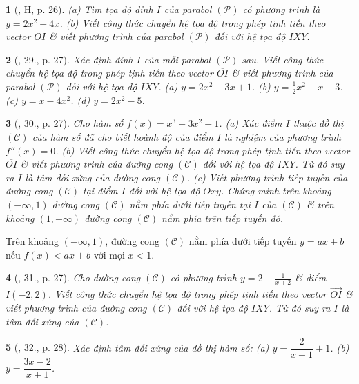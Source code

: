 \documentclass{article}
\newtheorem{baitoan}{}
\begin{document}
\begin{baitoan}[\cite{SGK_Toan_12_giai_tich_nang_cao}, H, p. 26]
	(a) Tìm tọa độ đỉnh $I$ của parabol $(\mathcal{P})$ có phương trình là $y = 2x^2 - 4x$. (b) Viết công thức chuyển hệ tọa độ trong phép tịnh tiến theo vector $\overline{OI}$ \& viết phương trình của parabol $(\mathcal{P})$ đối với hệ tọa độ $IXY$.
\end{baitoan}

\begin{baitoan}[\cite{SGK_Toan_12_giai_tich_nang_cao}, 29., p. 27]
	Xác định đỉnh $I$ của mỗi parabol $(\mathcal{P})$ sau. Viết công thức chuyển hệ tọa độ trong phép tịnh tiến theo vector $\overline{OI}$ \& viết phương trình của parabol $(\mathcal{P})$ đối với hệ tọa độ $IXY$. (a) $y = 2x^2 - 3x + 1$. (b) $y = \frac{1}{2}x^2 - x - 3$. (c) $y = x - 4x^2$. (d) $y = 2x^2 - 5$.
\end{baitoan}

\begin{baitoan}[\cite{SGK_Toan_12_giai_tich_nang_cao}, 30., p. 27]
	Cho hàm số $f(x) = x^3 - 3x^2 + 1$. (a) Xác điểm $I$ thuộc đồ thị $(\mathcal{C})$ của hàm số đã cho biết hoành độ của điểm $I$ là nghiệm của phương trình $f''(x) = 0$. (b) Viết công thức chuyển hệ tọa độ trong phép tịnh tiến theo vector $\overline{OI}$ \& viết phương trình của đường cong $(\mathcal{C})$ đối với hệ tọa độ $IXY$. Từ đó suy ra $I$ là tâm đối xứng của đường cong $(\mathcal{C})$. (c) Viết phương trình tiếp tuyến của đường cong $(\mathcal{C})$ tại điểm $I$ đối với hệ tọa độ $Oxy$. Chứng minh trên khoảng $(-\infty,1)$ đường cong $(\mathcal{C})$ nằm phía dưới tiếp tuyến tại $I$ của $(\mathcal{C})$ \& trên khoảng $(1,+\infty)$ đường cong $(\mathcal{C})$ nằm phía trên tiếp tuyến đó.
\end{baitoan}
 Trên khoảng $(-\infty,1)$, đường cong $(\mathcal{C})$ nằm phía dưới tiếp tuyến $y = ax + b$ nếu $f(x) < ax + b$ với mọi $x < 1$.

\begin{baitoan}[\cite{SGK_Toan_12_giai_tich_nang_cao}, 31., p. 27]
	Cho đường cong $(\mathcal{C})$ có phương trình $y = 2 - \frac{1}{x + 2}$ \& điểm $I(-2,2)$. Viết công thức chuyển hệ tọa độ trong phép tịnh tiến theo vector $\vec{OI}$ \& viết phương trình của đường cong $(\mathcal{C})$ đối với hệ tọa độ $IXY$. Từ đó suy ra $I$ là tâm đối xứng của $(\mathcal{C})$.
\end{baitoan}

\begin{baitoan}[\cite{SGK_Toan_12_giai_tich_nang_cao}, 32., p. 28]
	Xác định tâm đối xứng của đồ thị hàm số: (a) $y = \dfrac{2}{x - 1} + 1$. (b) $y = \dfrac{3x - 2}{x + 1}$.
\end{baitoan}
\end{document}
